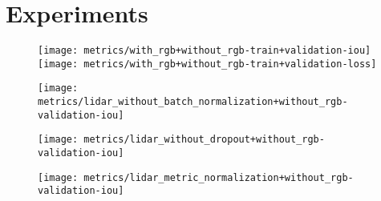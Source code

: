 \section{Experiments}%
\label{sec:experiments}

\begin{figure}[htb]
  \centering
  \texttt{[image: metrics/with\_rgb+without\_rgb-train+validation-iou]}
  \texttt{[image: metrics/with\_rgb+without\_rgb-train+validation-loss]}
\end{figure}

\begin{figure}[htb]
  \centering
  \texttt{[image: metrics/lidar\_without\_batch\_normalization+without\_rgb-validation-iou]}
\end{figure}

\begin{figure}[htb]
  \centering
  \texttt{[image: metrics/lidar\_without\_dropout+without\_rgb-validation-iou]}
\end{figure}

\begin{figure}[htb]
  \centering
  \texttt{[image: metrics/lidar\_metric\_normalization+without\_rgb-validation-iou]}
\end{figure}

